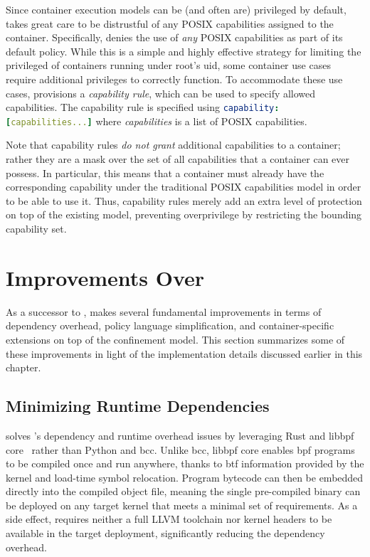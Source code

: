 Since container execution models can be (and often are) privileged by default,
\bpfcontain{} takes great care to be distrustful of any POSIX capabilities assigned to the
container. Specifically, \bpfcontain{} denies the use of \textit{any} POSIX capabilities
as part of its default policy. While this is a simple and highly effective strategy for
limiting the privileged of containers running under root's \gls{uid}, some container use
cases require additional privileges to correctly function. To accommodate these use cases,
\bpfcontain{} provisions a \textit{capability rule}, which can be used to specify allowed
capabilities. The capability rule is specified using \lstinline[language=yaml]|capability: [capabilities...]|
where \textit{capabilities} is a list of POSIX capabilities.

Note that capability rules \textit{do not grant} additional capabilities to a container;
rather they are a mask over the set of all capabilities that a container can ever possess.
In particular, this means that a container must already have the corresponding capability
under the traditional POSIX capabilities model in order to be able to use it. Thus,
capability rules merely add an extra level of protection on top of the existing model,
preventing overprivilege by restricting the bounding capability set.


\section{Improvements Over \bpfbox{}}%
\label{s:bpfcontain-improvements}

As a successor to \bpfbox{}, \bpfcontain{} makes several fundamental improvements in terms
of dependency overhead, policy language simplification, and container-specific extensions
on top of the \bpfbox{} confinement model. This section summarizes some of these
improvements in light of the implementation details discussed earlier in this chapter.

\subsection{Minimizing Runtime Dependencies}%
\label{ss:bpfcontain-minimizing}

\bpfcontain{} solves \bpfbox{}'s dependency and runtime overhead issues by leveraging Rust
and libbpf \gls{core}~\cite{nakryiko2020_core} rather than Python and bcc.  Unlike bcc,
libbpf \gls{core} enables \gls{bpf} programs to be compiled once and run anywhere, thanks
to \gls{btf} information provided by the kernel and load-time symbol relocation. Program
bytecode can then be embedded directly into the compiled object file, meaning the single
pre-compiled \bpfcontain{} binary can be deployed on any target kernel that meets
a minimal set of requirements. As a side effect, \bpfcontain{} requires neither a full
LLVM toolchain nor kernel headers to be available in the target deployment, significantly
reducing the dependency overhead.

